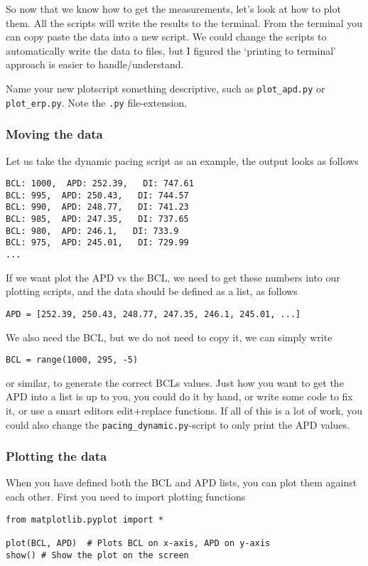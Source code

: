 \documentclass[a4paper, 11pt, notitlepage, english]{article}
\begin{document}
So now that we know how to get the measurements, let's look at how to plot them. All the scripts will write the results to the terminal. From the terminal you can copy paste the data into a new script. We could change the scripts to automatically write the data to files, but I figured the `printing to terminal' approach is easier to handle/understand.

Name your new plotscript something descriptive, such as \verb+plot_apd.py+ or \verb+plot_erp.py+. Note the \verb+.py+ file-extension. 

\subsubsection*{Moving the data}
Let us take the dynamic pacing script as an example, the output looks as follows
\begin{lstlisting}
BCL: 1000,  APD: 252.39,   DI: 747.61
BCL: 995,  APD: 250.43,   DI: 744.57
BCL: 990,  APD: 248.77,   DI: 741.23
BCL: 985,  APD: 247.35,   DI: 737.65
BCL: 980,  APD: 246.1,   DI: 733.9
BCL: 975,  APD: 245.01,   DI: 729.99
...
\end{lstlisting}

If we want plot the APD vs the BCL, we need to get these numbers into our plotting scripts, and the data should be defined as a list, as follows
\begin{lstlisting}
APD = [252.39, 250.43, 248.77, 247.35, 246.1, 245.01, ...]
\end{lstlisting}
We also need the BCL, but we do not need to copy it, we can simply write
\begin{lstlisting}
BCL = range(1000, 295, -5)
\end{lstlisting}
or similar, to generate the correct BCLs values. Just how you want to get the APD into a list is up to you, you could do it by hand, or write some code to fix it, or use a smart editors edit+replace functions. If all of this is a lot of work, you could also change the \verb+pacing_dynamic.py+-script to only print the APD values.


\subsubsection*{Plotting the data}
When you have defined both the BCL and APD lists, you can plot them against each other. First you need to import plotting functions
\begin{lstlisting}
from matplotlib.pyplot import *

plot(BCL, APD)  # Plots BCL on x-axis, APD on y-axis
show() # Show the plot on the screen
\end{lstlisting}
\end{document}
